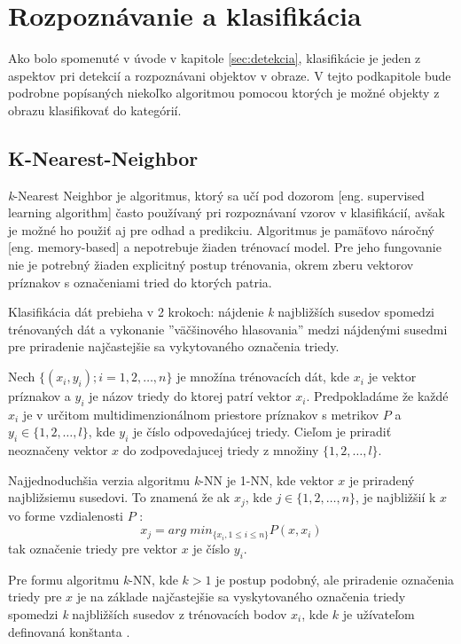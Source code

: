 
\section{Rozpoznávanie a klasifikácia}
\label{sec:klasifikacia}

Ako bolo spomenuté v úvode v kapitole \ref{sec:detekcia}, klasifikácie je jeden z aspektov pri detekcií a rozpoznávani objektov v obraze.
V tejto podkapitole bude podrobne popísaných niekoľko algoritmou pomocou ktorých je možné objekty z obrazu klasifikovať do kategórií.



\subsection{K-Nearest-Neighbor}
\textit{k}-Nearest Neighbor je algoritmus, ktorý sa učí pod dozorom [eng. supervised learning algorithm] často používaný pri rozpoznávaní vzorov v klasifikácií,
avšak je možné ho použiť aj pre odhad a predikciu\cite{book:DataMining}.
Algoritmus je pamäťovo náročný [eng. memory-based] a nepotrebuje žiaden trénovací model.
Pre jeho fungovanie nie je potrebný žiaden explicitný postup trénovania, okrem zberu vektorov príznakov s označeniami tried do ktorých patria.

Klasifikácia dát prebieha v 2 krokoch: nájdenie \textit{k} najbližších susedov spomedzi trénovaných dát a
vykonanie ''väčšinového hlasovania'' medzi nájdenými susedmi pre priradenie najčastejšie sa vykytovaného označenia triedy.

Nech $\{ (x_i, y_i); i = 1, 2, \dots, n \}$ je množína trénovacích dát, kde $x_i$ je vektor príznakov a $y_i$ je názov triedy do ktorej patrí vektor $x_i$.
Predpokladáme že každé $x_i$ je v určitom multidimenzionálnom priestore príznakov s metrikov $P$ a $y_i \in \{ 1, 2, \dots, l \}$, kde $y_i$ je číslo odpovedajúcej triedy.
Cieľom je priradiť neoznačeny vektor $x$ do zodpovedajucej triedy z množiny $\{ 1, 2, \dots, l \}$.

Najjednoduchšia verzia algoritmu \textit{k}-NN je 1-NN, kde vektor $x$ je priradený najbližsiemu susedovi.
To znamená že ak $x_j$, kde $j \in \{ 1, 2, \dots, n \}$, je najbližšií k $x$ vo forme vzdialenosti $P$ \cite{prop:KnnClassification}:
\begin{equation}
    \label{eq:kNNMetric}
    x_j = arg \; min_{\{x_i, 1 \leq i \leq n\}} P(x, x_i)
\end{equation}
tak označenie triedy pre vektor $x$ je číslo $y_i$.

Pre formu algoritmu \textit{k}-NN, kde $k > 1$ je postup podobný, ale priradenie označenia triedy pre $x$ je na základe najčastejšie sa vyskytovaného označenia triedy
spomedzi \textit{k} najbližších susedov z trénovacích bodov $x_i$, kde $k$ je užívateľom definovaná konštanta \cite{prop:KnnClassification}.

